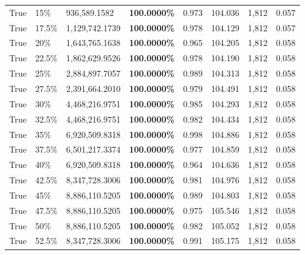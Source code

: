 \begin{table}[H]
\begin{tabular}{lllrllll}
\cline{1-8} \cline{2-8}
True & 15\% & 936,589.1582 & \bfseries \color{red} 100.0000\% & 0.973 & 104.036 & 1,812 & 0.057 \\
\cline{1-8} \cline{2-8}
True & 17.5\% & 1,129,742.1739 & \bfseries \color{red} 100.0000\% & 0.978 & 104.129 & 1,812 & 0.057 \\
\cline{1-8} \cline{2-8}
True & 20\% & 1,643,765.1638 & \bfseries \color{red} 100.0000\% & 0.965 & 104.205 & 1,812 & 0.058 \\
\cline{1-8} \cline{2-8}
True & 22.5\% & 1,862,629.9526 & \bfseries \color{red} 100.0000\% & 0.978 & 104.190 & 1,812 & 0.058 \\
\cline{1-8} \cline{2-8}
True & 25\% & 2,884,897.7057 & \bfseries \color{red} 100.0000\% & 0.989 & 104.313 & 1,812 & 0.058 \\
\cline{1-8} \cline{2-8}
True & 27.5\% & 2,391,664.2010 & \bfseries \color{red} 100.0000\% & 0.979 & 104.491 & 1,812 & 0.058 \\
\cline{1-8} \cline{2-8}
True & 30\% & 4,468,216.9751 & \bfseries \color{red} 100.0000\% & 0.985 & 104.293 & 1,812 & 0.058 \\
\cline{1-8} \cline{2-8}
True & 32.5\% & 4,468,216.9751 & \bfseries \color{red} 100.0000\% & 0.982 & 104.434 & 1,812 & 0.058 \\
\cline{1-8} \cline{2-8}
True & 35\% & 6,920,509.8318 & \bfseries \color{red} 100.0000\% & 0.998 & 104.886 & 1,812 & 0.058 \\
\cline{1-8} \cline{2-8}
True & 37.5\% & 6,501,217.3374 & \bfseries \color{red} 100.0000\% & 0.977 & 104.859 & 1,812 & 0.058 \\
\cline{1-8} \cline{2-8}
True & 40\% & 6,920,509.8318 & \bfseries \color{red} 100.0000\% & 0.964 & 104.636 & 1,812 & 0.058 \\
\cline{1-8} \cline{2-8}
True & 42.5\% & 8,347,728.3006 & \bfseries \color{red} 100.0000\% & 0.981 & 104.976 & 1,812 & 0.058 \\
\cline{1-8} \cline{2-8}
True & 45\% & 8,886,110.5205 & \bfseries \color{red} 100.0000\% & 0.989 & 104.803 & 1,812 & 0.058 \\
\cline{1-8} \cline{2-8}
True & 47.5\% & 8,886,110.5205 & \bfseries \color{red} 100.0000\% & 0.975 & 105.546 & 1,812 & 0.058 \\
\cline{1-8} \cline{2-8}
True & 50\% & 8,886,110.5205 & \bfseries \color{red} 100.0000\% & 0.982 & 105.052 & 1,812 & 0.058 \\
\cline{1-8} \cline{2-8}
True & 52.5\% & 8,347,728.3006 & \bfseries \color{red} 100.0000\% & 0.991 & 105.175 & 1,812 & 0.058 \\

\end{tabular}
\end{table}
